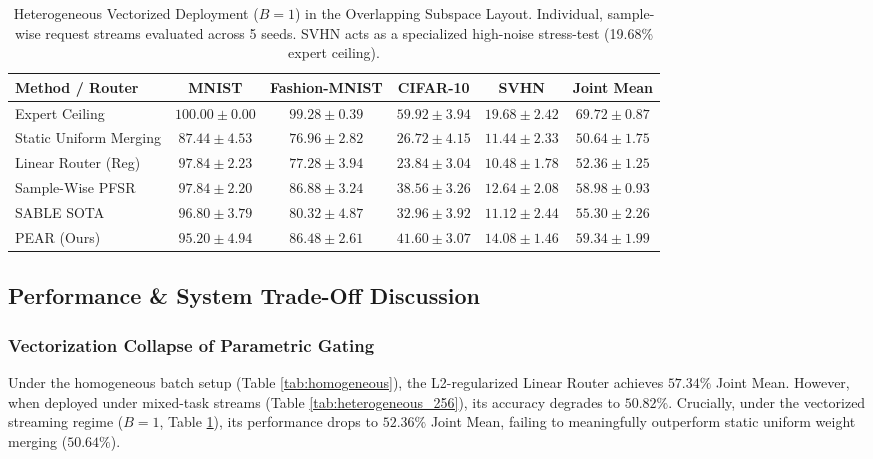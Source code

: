 \begin{table}[t]
\caption{Heterogeneous Vectorized Deployment ($B = 1$) in the Overlapping Subspace Layout. Individual, sample-wise request streams evaluated across 5 seeds. SVHN acts as a specialized high-noise stress-test (19.68\% expert ceiling).}
\label{tab:heterogeneous_1}
\vskip 0.15in
\begin{center}
\begin{small}
\begin{sc}
\begin{tabular}{lccccc}
\toprule
Method / Router & MNIST & Fashion-MNIST & CIFAR-10 & SVHN & Joint Mean \\
\midrule
Expert Ceiling & $100.00 \pm 0.00$ & $99.28 \pm 0.39$ & $59.92 \pm 3.94$ & $19.68 \pm 2.42$ & $\mathbf{69.72 \pm 0.87}$ \\
Static Uniform Merging & $87.44 \pm 4.53$ & $76.96 \pm 2.82$ & $26.72 \pm 4.15$ & $11.44 \pm 2.33$ & $\mathbf{50.64 \pm 1.75}$ \\
Linear Router (Reg) & $97.84 \pm 2.23$ & $77.28 \pm 3.94$ & $23.84 \pm 3.04$ & $10.48 \pm 1.78$ & $\mathbf{52.36 \pm 1.25}$ \\
Sample-Wise PFSR & $97.84 \pm 2.20$ & $86.88 \pm 3.24$ & $38.56 \pm 3.26$ & $12.64 \pm 2.08$ & $\mathbf{58.98 \pm 0.93}$ \\
SABLE SOTA & $96.80 \pm 3.79$ & $80.32 \pm 4.87$ & $32.96 \pm 3.92$ & $11.12 \pm 2.44$ & $\mathbf{55.30 \pm 2.26}$ \\
\midrule
PEAR (Ours) & $95.20 \pm 4.94$ & $86.48 \pm 2.61$ & $41.60 \pm 3.07$ & $14.08 \pm 1.46$ & $\mathbf{59.34 \pm 1.99}$ \\
\bottomrule
\end{tabular}
\end{sc}
\end{small}
\end{center}
\vskip -0.1in
\end{table}

\subsection{Performance \& System Trade-Off Discussion}

\subsubsection{Vectorization Collapse of Parametric Gating}
Under the homogeneous batch setup (Table \ref{tab:homogeneous}), the L2-regularized Linear Router achieves $57.34\%$ Joint Mean. However, when deployed under mixed-task streams (Table \ref{tab:heterogeneous_256}), its accuracy degrades to $50.82\%$. Crucially, under the vectorized streaming regime ($B=1$, Table \ref{tab:heterogeneous_1}), its performance drops to $\mathbf{52.36\%}$ Joint Mean, failing to meaningfully outperform static uniform weight merging ($50.64\%$).

